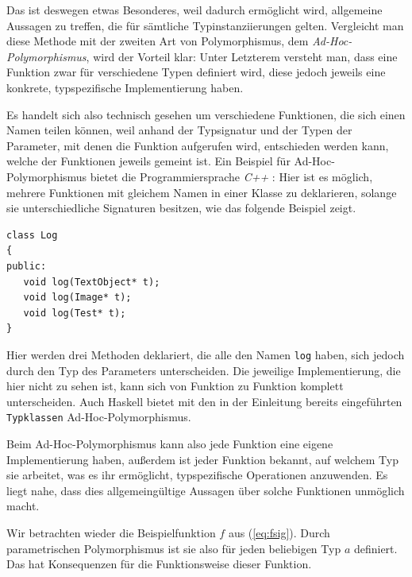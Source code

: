 Das ist deswegen etwas Besonderes, weil dadurch ermöglicht wird, allgemeine Aussagen zu treffen, die für sämtliche
Typinstanziierungen gelten. Vergleicht man diese Methode mit der zweiten Art von Polymorphismus, dem \textit{Ad-Hoc-Polymorphismus},
wird der Vorteil klar: Unter Letzterem versteht man, dass eine Funktion zwar für verschiedene Typen definiert wird, diese jedoch
jeweils eine konkrete, typspezifische Implementierung haben.

Es handelt sich also technisch gesehen um verschiedene Funktionen, die sich einen Namen teilen können, weil anhand der Typsignatur
und der Typen der Parameter, mit denen die Funktion aufgerufen wird, entschieden werden kann, welche der Funktionen jeweils gemeint ist.
Ein Beispiel für Ad-Hoc-Polymorphismus bietet die Programmiersprache \textit{C++} : Hier ist es möglich, mehrere Funktionen mit gleichem
Namen in einer Klasse zu deklarieren, solange sie unterschiedliche Signaturen besitzen, wie das folgende Beispiel zeigt.

\begin{verbatim}
class Log
{
public:
   void log(TextObject* t);
   void log(Image* t);
   void log(Test* t);
}
\end{verbatim}

Hier werden drei Methoden deklariert, die alle den Namen \texttt{log} haben, sich jedoch durch den Typ des Parameters
unterscheiden. Die jeweilige Implementierung, die hier nicht zu sehen ist, kann sich von Funktion zu Funktion komplett unterscheiden.
Auch Haskell bietet mit den in der Einleitung bereits eingeführten \texttt{Typklassen} Ad-Hoc-Polymorphismus.

Beim Ad-Hoc-Polymorphismus kann also jede Funktion eine eigene Implementierung haben, außerdem ist jeder Funktion
bekannt, auf welchem Typ sie arbeitet, was es ihr ermöglicht, typspezifische Operationen anzuwenden. Es liegt nahe, dass dies
allgemeingültige Aussagen über solche Funktionen unmöglich macht.


Wir betrachten wieder die Beispielfunktion $f$ aus (\ref{eq:fsig}). Durch parametrischen Polymorphismus ist sie also für jeden beliebigen
Typ $a$ definiert. Das hat Konsequenzen für die Funktionsweise dieser Funktion.


